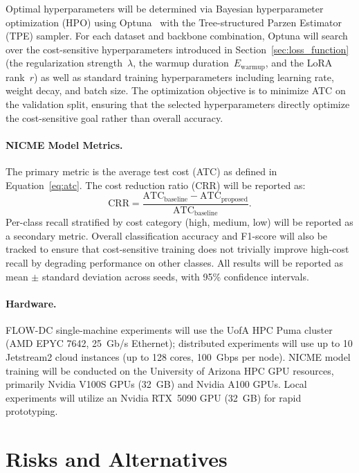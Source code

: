 \documentclass[11pt, letterpaper]{article}
\begin{document}
Optimal hyperparameters will be determined via Bayesian hyperparameter
optimization (HPO) using Optuna~\cite{akiba2019optuna} with the Tree-structured
Parzen Estimator (TPE) sampler. For each dataset and backbone combination,
Optuna will search over the cost-sensitive hyperparameters introduced in
Section~\ref{sec:loss_function} (the regularization strength~$\lambda$, the
warmup duration~$E_{\mathrm{warmup}}$, and the LoRA rank~$r$) as well as
standard training hyperparameters including learning rate, weight decay, and
batch size. The optimization objective is to minimize ATC on the validation
split, ensuring that the selected hyperparameters directly optimize the
cost-sensitive goal rather than overall accuracy.

\paragraph{NICME Model Metrics.}
The primary metric is the average test cost (ATC) as defined in
Equation~\ref{eq:atc}. The cost reduction ratio (CRR) will be reported as:
%
\begin{equation}
\label{eq:crr}
\mathrm{CRR} = \frac{\mathrm{ATC}_{\mathrm{baseline}}
  - \mathrm{ATC}_{\mathrm{proposed}}}
  {\mathrm{ATC}_{\mathrm{baseline}}}.
\end{equation}
%
Per-class recall stratified by cost category (high, medium, low) will be
reported as a secondary metric. Overall classification accuracy and F1-score will also be
tracked to ensure that cost-sensitive training does not trivially improve
high-cost recall by degrading performance on other classes. All results will be
reported as mean $\pm$ standard deviation across seeds, with 95\% confidence
intervals.

\paragraph{Hardware.}
FLOW-DC single-machine experiments will use the UofA HPC Puma cluster (AMD EPYC
7642, 25~Gb/s Ethernet); distributed experiments will use up to 10 Jetstream2
cloud instances (up to 128 cores, 100~Gbps per node). NICME model training will
be conducted on the University of Arizona HPC GPU resources, primarily Nvidia
V100S GPUs (32~GB) and Nvidia A100 GPUs. Local experiments will utilize an Nvidia RTX~5090
GPU (32~GB) for rapid prototyping.

\section{Risks and Alternatives}
\label{sec:risks}
\end{document}
